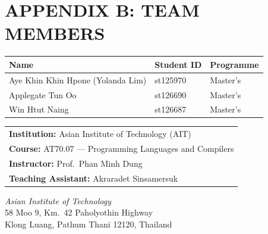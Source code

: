\chapter*{APPENDIX B: TEAM MEMBERS}

\vspace{1cm}

\begin{table}[h!]
\centering
\renewcommand{\arraystretch}{1.5}
\begin{tabular}{@{} l l l @{}}
\toprule
\textbf{Name} & \textbf{Student ID} & \textbf{Programme} \\
\midrule
Aye Khin Khin Hpone (Yolanda Lim) & st125970 & Master's \\
Applegate Tun Oo                   & st126690 & Master's \\
Win Htut Naing                     & st126687 & Master's \\
\bottomrule
\end{tabular}
\end{table}

\vspace{1cm}

\begin{tabular}{l}
    \textbf{Institution:} Asian Institute of Technology (AIT) \\
    \textbf{Course:} AT70.07 --- Programming Languages and Compilers \\
    \textbf{Instructor:} Prof.\ Phan Minh Dung \\
    \textbf{Teaching Assistant:} Akraradet Sinsamersuk \\
\end{tabular}

\vspace{1cm}

\begin{center}
\textit{Asian Institute of Technology} \\
58 Moo 9, Km.\ 42 Paholyothin Highway \\
Klong Luang, Pathum Thani 12120, Thailand
\end{center}
